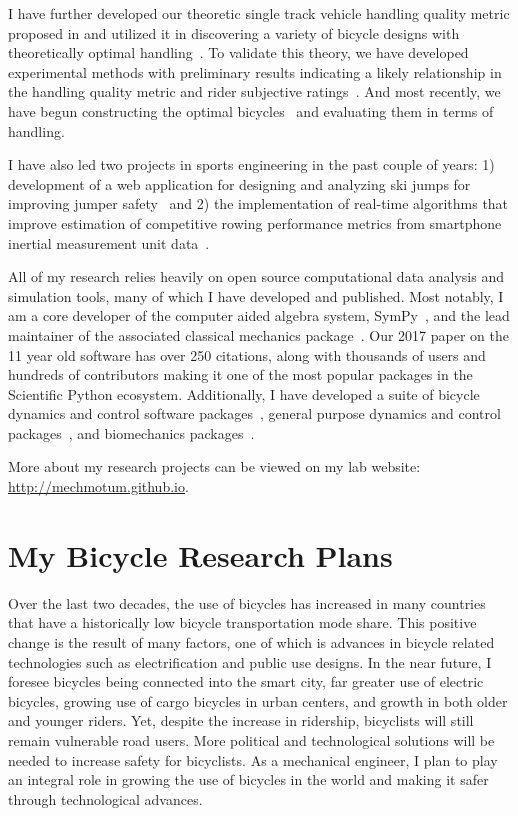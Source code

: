 \documentclass{article}
\begin{document}
I have further developed our theoretic single track vehicle handling quality
metric proposed in \cite{Hess2012} and utilized it in discovering a variety of
bicycle designs with theoretically optimal
handling~\cite{Moore2016,Moore2019a}. To validate this theory, we have
developed experimental methods with preliminary results indicating a likely
relationship in the handling quality metric and rider subjective
ratings~\cite{Kresie}. And most recently, we have begun constructing the
optimal bicycles~\cite{Gilboa2019a} and evaluating them in terms of handling.

I have also led two projects in sports engineering in the past couple of years:
1) development of a web application for designing and analyzing ski jumps for
improving jumper safety~\cite{Moore2018a,Cloud2019a} and 2) the implementation
of real-time algorithms that improve estimation of competitive rowing performance
metrics from smartphone inertial measurement unit data~\cite{Cloud2019b}.

All of my research relies heavily on open source computational data analysis
and simulation tools, many  of which I have developed and published. Most
notably, I am a core developer of the computer aided algebra system,
SymPy~\cite{SymPyDevelopmentTeam2006}, and the lead maintainer of the
associated classical mechanics package~\cite{Gede2013}. Our 2017 paper
\cite{Meurer2017} on the 11 year old software has over 250 citations, along
with thousands of users and hundreds of contributors making it one of the most
popular packages in the Scientific Python ecosystem. Additionally, I have
developed a suite of bicycle dynamics and control software
packages~\cite{Moore2010b,Moore2011d,Moore2011a,Moore2011e}, general purpose
dynamics and control packages~\cite{Moore2014,Moore2011}, and biomechanics
packages~\cite{Dembia2011,Moore2011,Moore2011b,Moore2013b}.

More about my research projects can be viewed on my lab website:
\url{http://mechmotum.github.io}.

\section*{My Bicycle Research Plans}
%
Over the last two decades, the use of bicycles has increased in many countries
that have a historically low bicycle transportation mode share. This positive
change is the result of many factors, one of which is advances in bicycle
related technologies such as electrification and public use designs. In the
near future, I foresee bicycles being connected into the smart city, far greater
use of electric bicycles, growing use of cargo bicycles in urban centers, and
growth in both older and younger riders. Yet, despite the increase in
ridership, bicyclists will still remain vulnerable road users. More political
and technological solutions will be needed to increase safety for bicyclists.
As a mechanical engineer, I plan to play an integral role in growing the use of
bicycles in the world and making it safer through technological advances.
\end{document}
